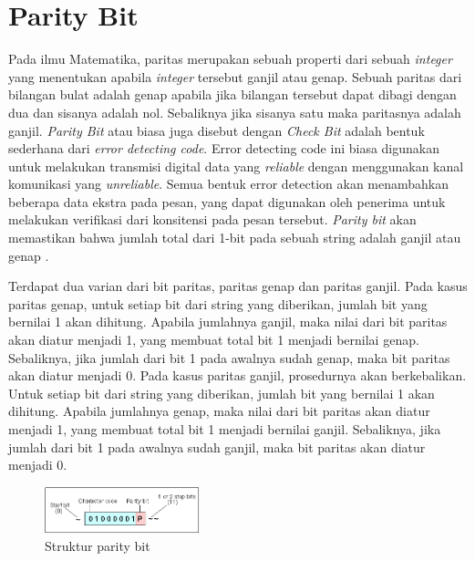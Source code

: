 \section{Parity Bit}
\label{sec:paritybit}


Pada ilmu Matematika, paritas merupakan sebuah properti dari sebuah \emph{integer} yang menentukan apabila \emph{integer} tersebut ganjil atau genap. Sebuah paritas dari bilangan bulat adalah genap apabila jika bilangan tersebut dapat dibagi dengan dua dan sisanya adalah nol. Sebaliknya jika sisanya satu maka paritasnya adalah ganjil.
\emph{Parity Bit} atau biasa juga disebut dengan \emph{Check Bit} adalah bentuk sederhana dari \emph{error detecting code}. Error detecting code ini biasa digunakan untuk melakukan transmisi digital data yang \emph{reliable} dengan menggunakan kanal komunikasi yang \emph{unreliable}. Semua bentuk error detection akan menambahkan beberapa data ekstra pada pesan, yang dapat digunakan oleh penerima untuk melakukan verifikasi dari konsitensi pada pesan tersebut. \emph{Parity bit} akan memastikan bahwa jumlah total dari 1-bit pada sebuah string adalah ganjil atau genap \citep{rodger2015}.

Terdapat dua varian dari bit paritas, paritas genap dan paritas ganjil. Pada kasus paritas genap, untuk setiap bit dari string yang diberikan, jumlah bit yang bernilai 1 akan dihitung. Apabila jumlahnya ganjil, maka nilai dari bit paritas akan diatur menjadi 1, yang membuat total bit 1 menjadi bernilai genap. Sebaliknya, jika jumlah dari bit 1 pada awalnya sudah genap, maka bit paritas akan diatur menjadi 0. Pada kasus paritas ganjil, prosedurnya akan berkebalikan. Untuk setiap bit dari string yang diberikan, jumlah bit yang bernilai 1 akan dihitung. Apabila jumlahnya genap, maka nilai dari bit paritas akan diatur menjadi 1, yang membuat total bit 1 menjadi bernilai ganjil. Sebaliknya, jika jumlah dari bit 1 pada awalnya sudah ganjil, maka bit paritas akan diatur menjadi 0.

\begin{figure} [ht]
  \centering
  \includegraphics[width=0.4\textwidth]{gambar/parity.png}

  \caption{Struktur parity bit}
  \label{fig:parityexample}
\end{figure}

